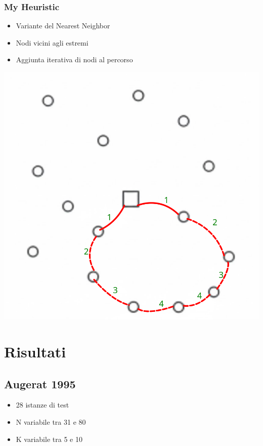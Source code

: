 \documentclass[compress]{beamer}
\begin{document}
\subsubsection{My Heuristic}
\begin{frame}{\subsubsecname}
    
    \begin{minipage}{0.49\textwidth}
        \begin{itemize}
        \item Variante del Nearest Neighbor
        \item Nodi vicini agli estremi
        \item Aggiunta iterativa di nodi al percorso
    \end{itemize}
    \end{minipage}
    \begin{minipage}{0.49\textwidth}
        \centering
        \includegraphics[width=0.8\linewidth]{images/my_heuristic.png}
    \end{minipage}
\end{frame}

\section{Risultati}

\subsection{Augerat 1995}

\begin{frame}{\subsecname}
    \begin{center}
        \begin{itemize}
            \item 28 istanze di test
            \item N variabile tra 31 e 80
            \item K variabile tra 5 e 10
        \end{itemize}
    \end{center}
\end{frame}
\end{document}
